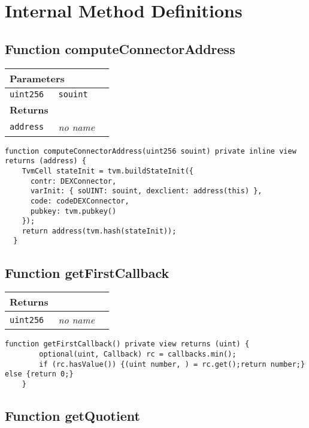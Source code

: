 \section{Internal Method Definitions}


\subsection{Function computeConnectorAddress}


\ifsoltables
\noindent\begin{tabular}{|l|l|p{5cm}|}\hline
\multicolumn{3}{|l|}{\bf Parameters}\\\hline
\tt uint256 & \tt souint &\\\hline
\multicolumn{3}{|l|}{\bf Returns}\\\hline
\tt address & {\em no name} &\\\hline
\end{tabular}
\fi



\begin{lstlisting}[firstnumber=142]
  function computeConnectorAddress(uint256 souint) private inline view returns (address) {
    TvmCell stateInit = tvm.buildStateInit({
      contr: DEXConnector,
      varInit: { soUINT: souint, dexclient: address(this) },
      code: codeDEXConnector,
      pubkey: tvm.pubkey()
    });
    return address(tvm.hash(stateInit));
  }
\end{lstlisting}

\subsection{Function getFirstCallback}


\ifsoltables
\noindent\begin{tabular}{|l|l|p{5cm}|}\hline
\multicolumn{3}{|l|}{\bf Returns}\\\hline
\tt uint256 & {\em no name} &\\\hline
\end{tabular}
\fi



\begin{lstlisting}[firstnumber=121]
  function getFirstCallback() private view returns (uint) {
		optional(uint, Callback) rc = callbacks.min();
		if (rc.hasValue()) {(uint number, ) = rc.get();return number;} else {return 0;}
	}
\end{lstlisting}

\subsection{Function getQuotient}


